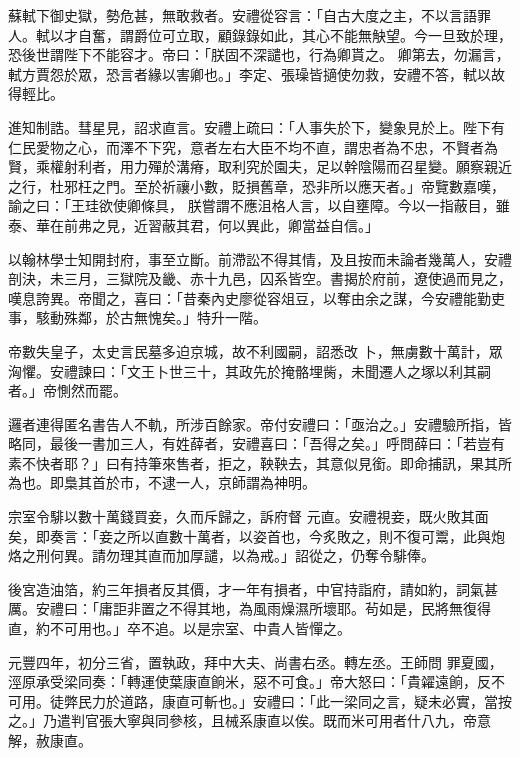 \begin{pinyinscope}
 蘇軾下御史獄，勢危甚，無敢救者。安禮從容言：「自古大度之主，不以言語罪人。軾以才自奮，謂爵位可立取，顧錄錄如此，其心不能無觖望。今一旦致於理，恐後世謂陛下不能容才。帝曰：「朕固不深譴也，行為卿貰之。
 卿第去，勿漏言，軾方賈怨於眾，恐言者緣以害卿也。」李定、張璪皆擿使勿救，安禮不答，軾以故得輕比。



 進知制誥。彗星見，詔求直言。安禮上疏曰：「人事失於下，變象見於上。陛下有仁民愛物之心，而澤不下究，意者左右大臣不均不直，謂忠者為不忠，不賢者為賢，乘權射利者，用力殫於溝瘠，取利究於園夫，足以幹陰陽而召星變。願察親近之行，杜邪枉之門。至於祈禳小數，貶損舊章，恐非所以應天者。」帝覽數嘉嘆，諭之曰：「王珪欲使卿條具，
 朕嘗謂不應沮格人言，以自壅障。今以一指蔽目，雖泰、華在前弗之見，近習蔽其君，何以異此，卿當益自信。」



 以翰林學士知開封府，事至立斷。前滯訟不得其情，及且按而未論者幾萬人，安禮剖決，未三月，三獄院及畿、赤十九邑，囚系皆空。書揭於府前，遼使過而見之，嘆息誇異。帝聞之，喜曰：「昔秦內史廖從容俎豆，以奪由余之謀，今安禮能勤吏事，駭動殊鄰，於古無愧矣。」特升一階。



 帝數失皇子，太史言民墓多迫京城，故不利國嗣，詔悉改
 卜，無虜數十萬計，眾洶懼。安禮諫曰：「文王卜世三十，其政先於掩骼埋胔，未聞遷人之塚以利其嗣者。」帝惻然而罷。



 邏者連得匿名書告人不軌，所涉百餘家。帝付安禮曰：「亟治之。」安禮驗所指，皆略同，最後一書加三人，有姓薛者，安禮喜曰：「吾得之矣。」呼問薛曰：「若豈有素不快者耶？」曰有持筆來售者，拒之，鞅鞅去，其意似見銜。即命捕訊，果其所為也。即梟其首於市，不逮一人，京師謂為神明。



 宗室令騑以數十萬錢買妾，久而斥歸之，訴府督
 元直。安禮視妾，既火敗其面矣，即奏言：「妾之所以直數十萬者，以姿首也，今炙敗之，則不復可鬻，此與炮烙之刑何異。請勿理其直而加厚譴，以為戒。」詔從之，仍奪令騑俸。



 後宮造油箔，約三年損者反其價，才一年有損者，中官持詣府，請如約，詞氣甚厲。安禮曰：「庸詎非置之不得其地，為風雨燥濕所壞耶。茍如是，民將無復得直，約不可用也。」卒不追。以是宗室、中貴人皆憚之。



 元豐四年，初分三省，置執政，拜中大夫、尚書右丞。轉左丞。王師問
 罪夏國，涇原承受梁同奏：「轉運使葉康直餉米，惡不可食。」帝大怒曰：「貴糴遠餉，反不可用。徒弊民力於道路，康直可斬也。」安禮曰：「此一梁同之言，疑未必實，當按之。」乃遣判官張大寧與同參核，且械系康直以俟。既而米可用者什八九，帝意解，赦康直。




\end{pinyinscope}
